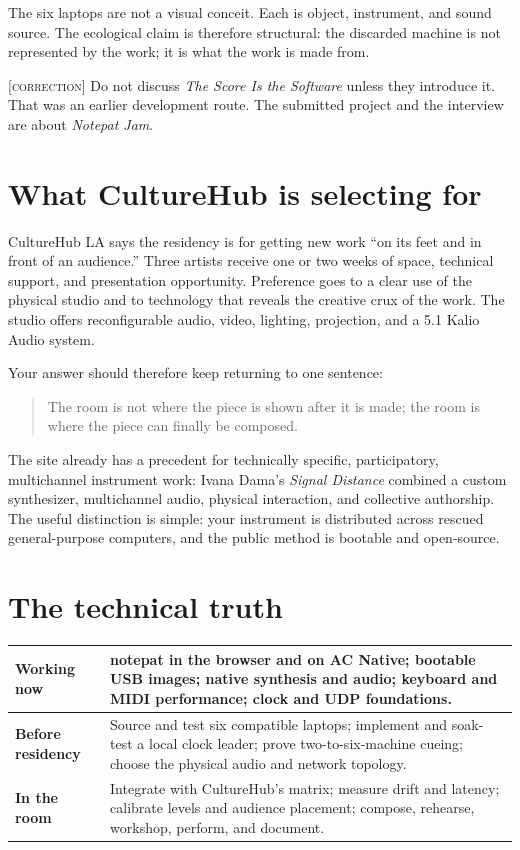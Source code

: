 \documentclass[11pt,letterpaper]{article}
\newcommand{\soft}[1]{{\color{acwarn}\footnotesize\textsc{[#1]}}}
\begin{document}
\noindent The six laptops are not a visual conceit. Each is object, instrument,
and sound source. The ecological claim is therefore structural: the discarded
machine is not represented by the work; it is what the work is made from.

\soft{correction} Do not discuss \textit{The Score Is the Software} unless they
introduce it. That was an earlier development route. The submitted project and
the interview are about \textit{Notepat Jam}.

\section{What CultureHub is selecting for}

CultureHub LA says the residency is for getting new work ``on its feet and in
front of an audience.'' Three artists receive one or two weeks of space,
technical support, and presentation opportunity. Preference goes to a clear use
of the physical studio and to technology that reveals the creative crux of the
work. The studio offers reconfigurable audio, video, lighting, projection, and a
5.1 Kalio Audio system.

Your answer should therefore keep returning to one sentence:

\begin{quote}
\color{acdark}\large
The room is not where the piece is shown after it is made; the room is where the
piece can finally be composed.
\end{quote}

The site already has a precedent for technically specific, participatory,
multichannel instrument work: Ivana Dama's \textit{Signal Distance} combined a
custom synthesizer, multichannel audio, physical interaction, and collective
authorship. The useful distinction is simple: your instrument is distributed
across rescued general-purpose computers, and the public method is bootable and
open-source.

\section{The technical truth}

\begin{tabularx}{\textwidth}{@{}>{\bfseries}p{}X@{}}
\toprule
Working now & notepat in the browser and on AC Native; bootable USB images;
native synthesis and audio; keyboard and MIDI performance; clock and UDP
foundations. \\
\midrule
Before residency & Source and test six compatible laptops; implement and soak-test
a local clock leader; prove two-to-six-machine cueing; choose the physical audio
and network topology. \\
\midrule
In the room & Integrate with CultureHub's matrix; measure drift and latency;
calibrate levels and audience placement; compose, rehearse, workshop, perform,
and document. \\
\bottomrule
\end{tabularx}
\end{document}
